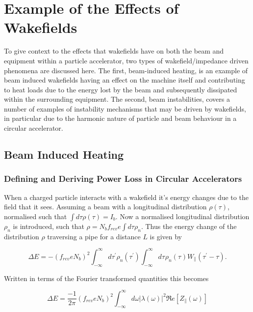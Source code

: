 \section{Example of the Effects of Wakefields}

To give context to the effects that wakefields have on both the beam and equipment within a particle accelerator, two types of wakefield/impedance driven phenomena are discussed here. The first, beam-induced heating, is an example of beam induced wakefields having an effect on the machine itself and contributing to heat loads due to the energy lost by the beam and subsequently dissipated within the surrounding equipment. The second, beam instabilities, covers a number of examples of instability mechanisms that may be driven by wakefields, in particular due to the harmonic nature of particle and beam behaviour in a circular accelerator.

\subsection{Beam Induced Heating}
\label{sec:beam_induced_heating}

\subsubsection{Defining and Deriving Power Loss in Circular Accelerators}
\label{sec:power_loss}

When a charged particle interacts with a wakefield it's energy changes due to the field that it sees. Assuming a beam with a longitudinal distribution $\rho (\tau)$, normalised such that $\int d \tau \rho (\tau ) = I_{b}$. Now a normalised longitudinal distribution $\rho_{n}$ is introduced, such that $\rho = N_{b} f_{rev} e \int d \tau \rho_{n}$. Thus the energy change of the distribution $\rho$ traversing a pipe for a distance $L$ is given by \cite{Chao:PhysColEff, Ng:IntDepInstab}

\begin{equation}
\Delta E = - \left( f_{rev} e N_{b}\right)^{2} \int^{\infty}_{-\infty} d\tau^{'} \rho_{n} \left( \tau^{'} \right) \int^{\infty}_{-\infty} d\tau^{} \rho_{n} \left( \tau^{} \right) W_{\parallel} \left( \tau^{'} - \tau \right).  
\end{equation}

Written in terms of the Fourier transformed quantities this becomes

\begin{equation}
\Delta E = \frac{-1}{2\pi}\left( f_{rev} e N_{b}\right)^{2} \int^{\infty}_{-\infty} d\omega \left| \lambda \left( \omega \right)  \right|^{2} \Re{}e \left[ Z_{\parallel} \left( \omega \right) \right]
\end{equation}

